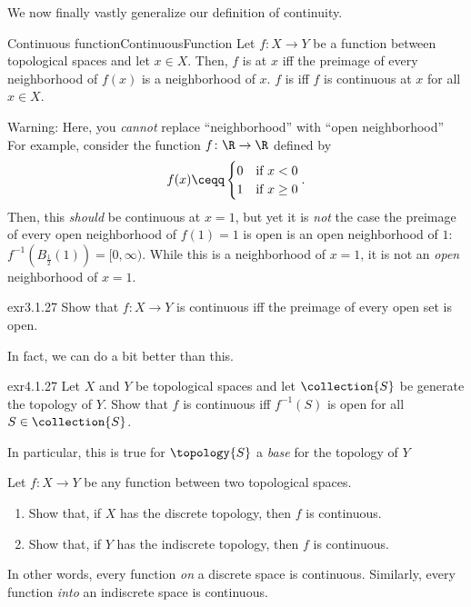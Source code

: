 We now finally vastly generalize our definition of continuity.
\begin{dfn}{Continuous function}{ContinuousFunction}
Let $f\colon X\rightarrow Y$ be a function between topological spaces and let $x\in X$.  Then, $f$ is  at $x$ iff the preimage of every neighborhood of $f(x)$ is a neighborhood of $x$.  $f$ is  iff $f$ is continuous at $x$ for all $x\in X$.
\begin{wrn}
Warning:  Here, you \emph{cannot} replace ``neighborhood'' with ``open neighborhood''  For example, consider the function $f\colon \R \rightarrow \R$ defined by
\begin{equation}
f(x)\ceqq \begin{cases}0 & \text{if }x<0 \\ 1 & \text{if }x\geq 0\end{cases}.
\end{equation}
Then, this \emph{should} be continuous at $x=1$, but yet it is \emph{not} the case the preimage of every open neighborhood of $f(1)=1$ is open is an open neighborhood of $1$:  $f^{-1}(B_{\frac{1}{2}}(1))=[0,\infty )$.  While this is a neighborhood of $x=1$, it is not an \emph{open} neighborhood of $x=1$.
\end{wrn}
\end{dfn}
\begin{exr}{}{exr3.1.27}
Show that $f\colon X\rightarrow Y$ is continuous iff the preimage of every open set is open.
\end{exr}
In fact, we can do a bit better than this.
\begin{exr}{}{exr4.1.27}
Let $X$ and $Y$ be topological spaces and let $\collection{S}$ be generate the topology of $Y$.  Show that $f$ is continuous iff $f^{-1}(S)$ is open for all $S\in \collection{S}$.
\begin{rmk}
In particular, this is true for $\topology{S}$ a \emph{base} for the topology of $Y$
\end{rmk}
\end{exr}
\begin{exr}{}{}
Let $f\colon X\rightarrow Y$ be any function between two topological spaces.
\begin{enumerate}
\item Show that, if $X$ has the discrete topology, then $f$ is continuous.
\item Show that, if $Y$ has the indiscrete topology, then $f$ is continuous.
\end{enumerate}
\begin{rmk}
In other words, every function \emph{on} a discrete space is continuous.  Similarly, every function \emph{into} an indiscrete space is continuous.
\end{rmk}
\end{exr}

